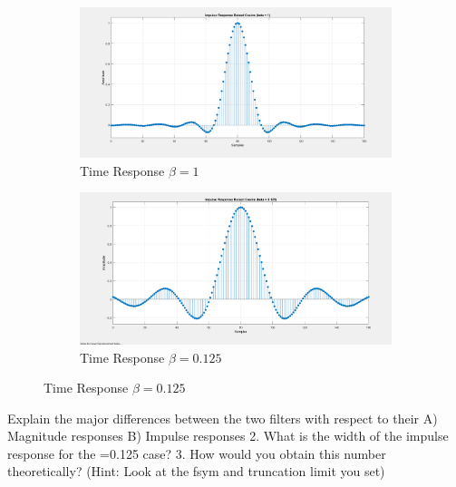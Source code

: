 \documentclass{article}
\begin{document}
\begin{figure}[h]
  \begin{center}

    \begin{subfigure}[b]{0.5\linewidth}
      \includegraphics[width=\linewidth]{img/impulse_response_beta_1.png}
      \caption{Time Response $\beta = 1$}
    \end{subfigure}

    \begin{subfigure}[b]{0.5\linewidth}
      \includegraphics[width=\linewidth]{img/impulse_response_beta_125.png}
      \caption{Time Response $\beta = 0.125$}
    \end{subfigure}

  \end{center}
\end{figure}

Explain the major differences between the two filters with respect to their
	A) Magnitude responses 
	B) Impulse responses
2. What is the width of the impulse response for the =0.125 case? 
3. How would you obtain this number theoretically? (Hint: Look at the fsym and truncation limit you set)
\end{document}
